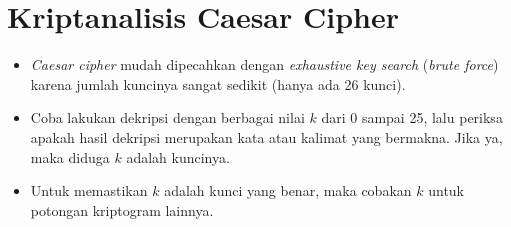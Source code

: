 \documentclass{article}
\begin{document}

\section*{Kriptanalisis Caesar Cipher}

\begin{itemize}
    \item \textit{Caesar cipher} mudah dipecahkan dengan \textit{exhaustive key search} (\textit{brute force}) karena jumlah kuncinya sangat sedikit (hanya ada 26 kunci).
    \item Coba lakukan dekripsi dengan berbagai nilai $k$ dari 0 sampai 25, lalu periksa apakah hasil dekripsi merupakan kata atau kalimat yang bermakna. Jika ya, maka diduga $k$ adalah kuncinya.
    \item Untuk memastikan $k$ adalah kunci yang benar, maka cobakan $k$ untuk potongan kriptogram lainnya.
\end{itemize}
\end{document}
